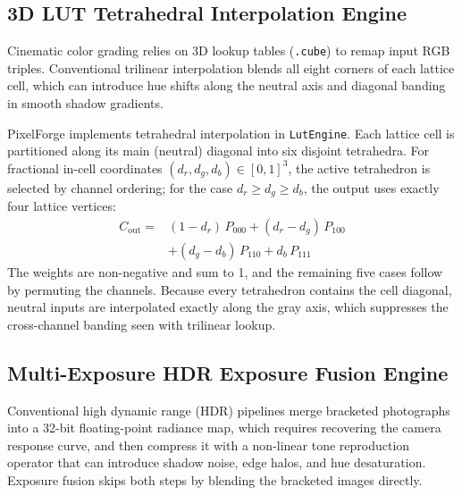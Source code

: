 \documentclass[10pt,journal,compsoc]{IEEEtran}
\begin{document}
\subsection{3D LUT Tetrahedral Interpolation Engine}
Cinematic color grading relies on 3D lookup tables (\texttt{.cube}) to remap input RGB triples. Conventional trilinear interpolation blends all eight corners of each lattice cell, which can introduce hue shifts along the neutral axis and diagonal banding in smooth shadow gradients.

PixelForge implements tetrahedral interpolation in \texttt{LutEngine}. Each lattice cell is partitioned along its main (neutral) diagonal into six disjoint tetrahedra. For fractional in-cell coordinates $(d_r, d_g, d_b) \in [0, 1]^3$, the active tetrahedron is selected by channel ordering; for the case $d_r \ge d_g \ge d_b$, the output uses exactly four lattice vertices:
\begin{equation}
\begin{aligned}
C_{\text{out}} ={}& (1 - d_r)\, P_{000} + (d_r - d_g)\, P_{100} \\
&+ (d_g - d_b)\, P_{110} + d_b\, P_{111}
\end{aligned}
\end{equation}
The weights are non-negative and sum to 1, and the remaining five cases follow by permuting the channels. Because every tetrahedron contains the cell diagonal, neutral inputs are interpolated exactly along the gray axis, which suppresses the cross-channel banding seen with trilinear lookup.

\subsection{Multi-Exposure HDR Exposure Fusion Engine}
Conventional high dynamic range (HDR) pipelines merge bracketed photographs into a 32-bit floating-point radiance map, which requires recovering the camera response curve, and then compress it with a non-linear tone reproduction operator that can introduce shadow noise, edge halos, and hue desaturation. Exposure fusion skips both steps by blending the bracketed images directly.
\end{document}
